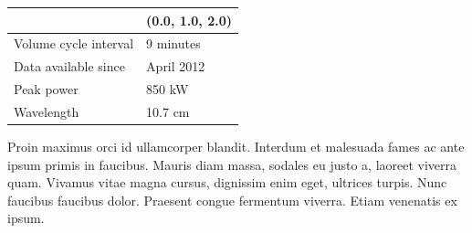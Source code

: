 \begin{multicols}{2}
\begin{minipage}[t]{0.45\textwidth}
\begin{center}
\begin{tabular}{l l}
&(0.0, 1.0, 2.0)
\\
\hline
Volume cycle interval        & 9 minutes                                                                                                      \\
Data available since         & April 2012                                                                                                     \\
Peak power                   & 850 kW                                                                                                         \\
Wavelength                   & 10.7 cm                                                                                                        \\ \hline
\end{tabular}
\end{center}
\end{minipage}%


Proin maximus orci id ullamcorper blandit. Interdum et malesuada fames ac ante ipsum primis in faucibus. Mauris diam massa, sodales eu justo a, laoreet viverra quam. Vivamus vitae magna cursus, dignissim enim eget, ultrices turpis. Nunc faucibus faucibus dolor. Praesent congue fermentum viverra. Etiam venenatis ex ipsum.


\end{multicols}
